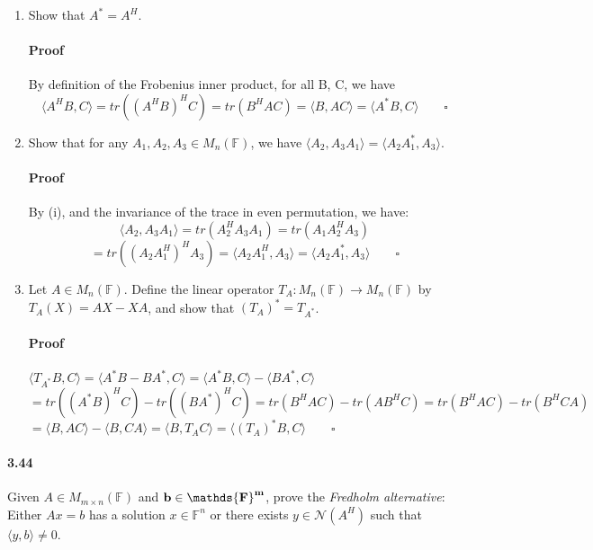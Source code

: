 \documentclass[letterpaper,12pt]{article}
\theoremstyle{definition}
\begin{document}
\begin{enumerate}[label=(\roman*)]

\item Show that $A^* = A^H$.

\paragraph{Proof} By definition of the Frobenius inner product, for all B, C, we have 
$$ 
\langle A^HB, C \rangle = tr((A^HB)^HC) = tr(B^HAC) 
= \langle B, AC \rangle = \langle A^*B, C \rangle 
\qquad \square $$

\item Show that for any $A_1, A_2, A_3 \in M_n(\mathds{F})$, we have $\langle A_2, A_3A_1  \rangle = \langle A_2A_1^*, A_3 \rangle$.

\paragraph{Proof} By (i), and the invariance of the trace in even permutation, we have: $$\langle A_2, A_3A_1  \rangle 
= tr(A_2^HA_3A_1) = tr(A_1A_2^HA_3) $$
$$= tr((A_2A_1^H)^HA_3)
= \langle A_2A_1^H, A_3 \rangle
= \langle A_2A_1^*, A_3 \rangle \qquad \square$$

\item Let $A \in M_n(\mathds{F})$. Define the linear operator $T_A: M_n(\mathds{F}) \rightarrow M_n(\mathds{F})$ by $T_A(X) = AX - XA$, and show that $(T_A)^* = T_{A^*}$.

\paragraph{Proof}
$ \langle T_{A^*}B, C \rangle = \langle A^*B - BA^*, C \rangle 
= \langle A^*B , C \rangle - \langle BA^*, C \rangle$ 
$$ = tr((A^*B)^HC)  - tr((BA^*)^HC) = tr(B^HAC) - tr(AB^HC) 
= tr(B^HAC) - tr(B^HCA) 
$$
$
= \langle B , AC \rangle - \langle B, CA \rangle
= \langle B , T_AC \rangle = \langle (T_A)^*B, C \rangle \qquad \square$ 

\end{enumerate}

\paragraph{3.44} Given $A \in M_{m \times n}(\mathds{F})$  and $\bf b \in \mathds{F}^m$, prove the \emph{Fredholm alternative}: Either $Ax = b$ has a solution $x \in \mathds{F}^n$ or there exists $y \in \mathscr{N}(A^H)$ such that $\langle y, b \rangle \neq 0$.
\end{document}
